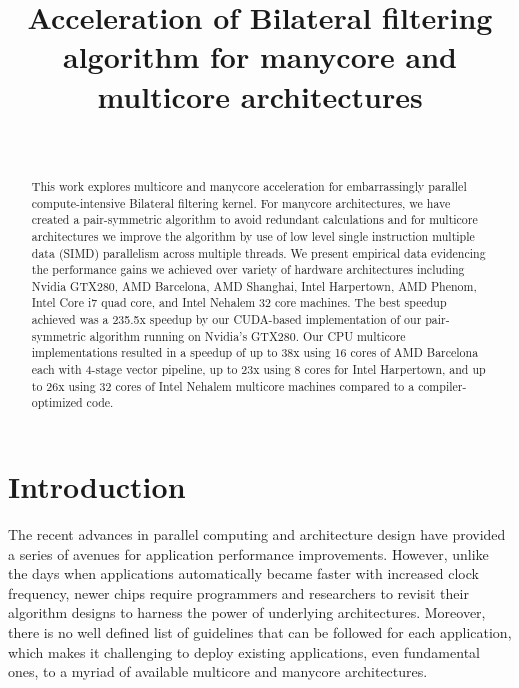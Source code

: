 \documentclass{IEEEtran}
\begin{document}
\title{Acceleration of Bilateral filtering algorithm for manycore and multicore architectures}


\author{\\
 }
\maketitle
\begin{abstract}
This work explores multicore and manycore acceleration for embarrassingly parallel compute-intensive Bilateral filtering kernel. For manycore architectures, we have created a pair-symmetric algorithm to avoid redundant calculations and for multicore architectures we improve the algorithm by use of low level single instruction multiple data (SIMD) parallelism across multiple threads. We present empirical data evidencing the performance gains we achieved over variety of hardware architectures including Nvidia GTX280, AMD Barcelona, AMD Shanghai, Intel Harpertown, AMD Phenom, Intel Core i7 quad core, and Intel Nehalem 32 core machines. The best speedup achieved was a 235.5x speedup by our CUDA-based implementation of our pair-symmetric algorithm running on Nvidia's GTX280. Our CPU multicore implementations resulted in a speedup of up to 38x using 16 cores of AMD Barcelona each with 4-stage vector pipeline, up to 23x using 8 cores for Intel Harpertown, and up to 26x using 32 cores of Intel Nehalem multicore machines compared to a compiler-optimized code.
\end{abstract}
\IEEEpeerreviewmaketitle
\section{Introduction}
\label{sec:intro} The recent advances in parallel computing and architecture design have provided a series of avenues for application performance improvements. However, unlike the days when applications automatically became faster with increased clock frequency, newer chips require programmers and researchers to revisit their algorithm designs to harness the power of underlying architectures. Moreover, there is no well defined list of guidelines that can be followed for each application, which makes it challenging to deploy existing applications, even fundamental ones, to a myriad of available multicore and manycore architectures.
\end{document}
